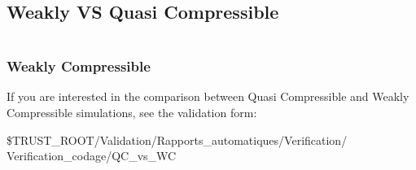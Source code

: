 \documentclass[10pt, hyperref={unicode=true,pdfusetitle, bookmarks=true,bookmarksnumbered=false,bookmarksopen=false, breaklinks=false,pdfborder={0 0l 1},backref=true,colorlinks=true,linkcolor=darkblue,pageanchor}]{beamer}
\begin{document}
\subsection{Weakly VS Quasi Compressible}
\begin{frame}
\begin{small}
\begin{columns}[c] 
\tableofcontents[sections={1-8},currentsection, currentsubsection]
\tableofcontents[sections={9-16},currentsection, currentsubsection]
\end{columns}
\end{small}
\end{frame}
\begin{frame}
\frametitle{Weakly Compressible}
\begin{block}{}
If you are interested in the comparison between Quasi Compressible and Weakly Compressible simulations, see the validation form:

\$TRUST\_ROOT/Validation/Rapports\_automatiques/Verification/\\ Verification\_codage/QC\_vs\_WC


\end{block}

\end{frame}
\end{document}
